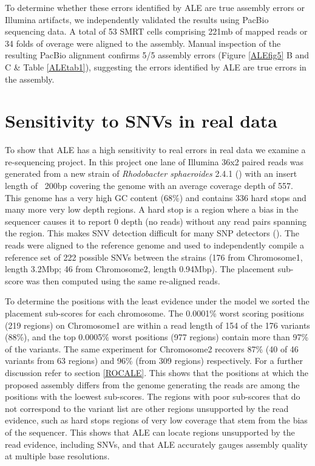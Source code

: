 \documentclass[phd,tocprelim]{cornell}
\begin{document}
To determine whether these errors identified by ALE are true assembly errors or Illumina artifacts, we independently validated the results using PacBio sequencing data. A total of 53 SMRT cells comprising 221mb of mapped reads or 34 folds of overage were aligned to the assembly. Manual inspection of the resulting PacBio alignment confirms 5/5 assembly errors (Figure \ref{ALEfig5} B and C \& Table \ref{ALEtab1}), suggesting the errors identified by ALE are true errors in the assembly. 

\section{Sensitivity to SNVs in real data}
\label{SNVsReal}
To show that ALE has a high sensitivity to real errors in real data we examine a re-sequencing project. In this project one lane of Illumina 36x2 paired reads was generated from a new strain of {\it Rhodobacter sphaeroides} 2.4.1 (\cite{Choudhary2006}) with an insert length of ~200bp covering the genome with an average coverage depth of 557. This genome has a very high GC content (68\%) and contains 336 hard stops and many more very low depth regions. A hard stop is a region where a bias in the sequencer causes it to report 0 depth (no reads) without any read pairs spanning the region. This makes SNV detection difficult for many SNP detectors (\cite{Wang2011}). The reads were aligned to the reference genome and used to independently compile a reference set of 222 possible SNVs between the strains (176 from Chromosome1, length 3.2Mbp; 46 from Chromosome2, length 0.94Mbp). The placement sub-score was then computed using the same re-aligned reads.

To determine the positions with the least evidence under the model we sorted the placement sub-scores for each chromosome. The 0.0001\% worst scoring positions (219 regions) on Chromosome1 are within a read length of 154 of the 176 variants (88\%), and the top 0.0005\% worst positions (977 regions) contain more than 97\% of the variants. The same experiment for Chromosome2 recovers 87\% (40 of 46 variants from 63 regions) and 96\% (from 309 regions) respectively. For a further discussion refer to section \ref{ROCALE}. This shows that the positions at which the proposed assembly differs from the genome generating the reads are among the positions with the loewest sub-scores.  The regions with poor sub-scores that do not correspond to the variant list are other regions unsupported by the read evidence, such as hard stops regions of very low coverage that stem from the bias of the sequencer. This shows that ALE can locate regions unsupported by the read evidence, including SNVs, and that ALE accurately gauges assembly quality at multiple base resolutions.
\end{document}
